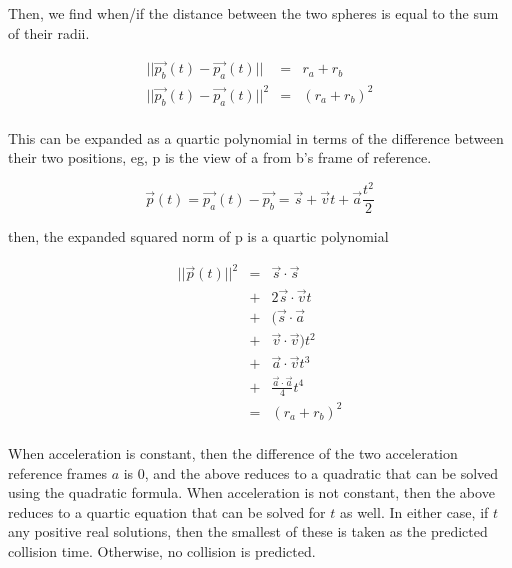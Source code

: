 \documentclass[conference]{IEEEtran}
\begin{document}
Then, we find when/if the distance between the two spheres is equal to the sum of their radii.  

\begin{eqnarray*}
|| \vec{p_b}(t)-\vec{p_a}(t) ||&=&r_a+r_b \\
|| \vec{p_b}(t)-\vec{p_a}(t) || ^ 2&=&(r_a+r_b) ^ 2 \\
\end{eqnarray*}

This can be expanded as a quartic polynomial in terms of the difference between their two positions, eg, p is the view of a from b's frame of reference.
  
\begin{equation}
\vec{p}(t)=\vec{p_a}(t)-\vec{p_b}=\vec{s}+\vec{v} t+\vec{a} \frac{t ^ 2}{2}
\end{equation}

then, the expanded squared norm of p is a quartic polynomial

\begin{eqnarray*}
	|| \vec{p}(t) || ^ 2 &=&\vec{s} \cdot \vec{s} \\
	&+&2 \vec{s} \cdot \vec{v} t \\
	&+& (\vec{s} \cdot \vec{a} \\ 
	&+&  \vec{v} \cdot \vec{v}) t ^ 2 \\
	&+& \vec{a} \cdot \vec{v} t ^ 3 \\
	&+& \frac{\vec{a} \cdot \vec{a}}{4} t ^ 4 \\
	&=& (r_a+r_b) ^ 2 \\
\end{eqnarray*}

When acceleration is constant, then the difference of the two acceleration reference frames $a$ is 0, and the above reduces to a quadratic that can be solved using the quadratic formula.
When acceleration is not constant, then the above reduces to a quartic equation that can be solved for $t$ as well.   In either case, if $t$ any positive real solutions, then the smallest of these 
is taken as the predicted collision time.  Otherwise, no collision is predicted. 
\end{document}
